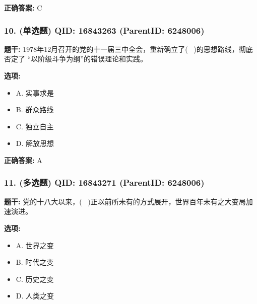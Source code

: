 \documentclass[12pt,UTF8]{ctexart}
\begin{document}
\textbf{正确答案:}
C

\vspace{0.3em}\hrulefill\vspace{0.7em}

\subsubsection*{10. (单选题) \small QID: 16843263 (ParentID: 6248006)}

\textbf{题干:}
1978年12月召开的党的十一届三中全会，重新确立了(  )的思想路线，彻底否定了 “以阶级斗争为纲”的错误理论和实践。



\textbf{选项:}
\begin{itemize}[leftmargin=*]

  \item A. 实事求是

  \item B. 群众路线

  \item C. 独立自主

  \item D. 解放思想

\end{itemize}

\textbf{正确答案:}
A

\vspace{0.3em}\hrulefill\vspace{0.7em}

\subsubsection*{11. (多选题) \small QID: 16843271 (ParentID: 6248006)}

\textbf{题干:}
党的十八大以来，(  )正以前所未有的方式展开，世界百年未有之大变局加速演进。



\textbf{选项:}
\begin{itemize}[leftmargin=*]

  \item A. 世界之变

  \item B. 时代之变

  \item C. 历史之变

  \item D. 人类之变

\end{itemize}
\end{document}
